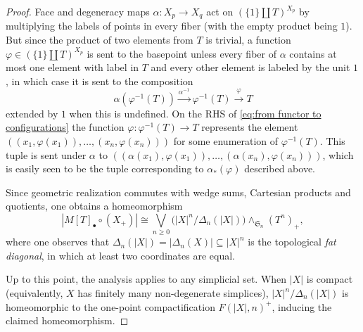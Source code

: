 \documentclass[12pt]{article}
\newcommand{\SymGroup}[1][n]{\mathfrak{S}_{#1}}
\theoremstyle{plain}
\theoremstyle{definition}
\theoremstyle{remark}
\begin{document}
\begin{proof}
Face and degeneracy maps $\alpha: X_p\to X_q$ act on $(\{1\}\coprod T)^{X_p}$ by multiplying the labels of points in every fiber (with the empty product being $1$). But since the product of two elements from $T$ is trivial, a function $\varphi\in (\{1\}\coprod T)^{X_p}$ is sent to the basepoint unless every fiber of $\alpha$ contains at most one element with label in $T$ and every other element is labeled by the unit $1$, in which case it is sent to the composition 
\[
\alpha(\varphi^{-1}(T)) \overset{\alpha^{-1}}{\longrightarrow} \varphi^{-1}(T) \overset{\varphi}\longrightarrow T
\]
extended by $1$ when this is undefined. On the RHS of \eqref{eq:from functor to configurations} the function $\varphi: \varphi^{-1}(T)\to T$ represents the element $((x_1,\varphi(x_1)),\ldots, (x_n,\varphi(x_n)))$ for some enumeration of $\varphi^{-1}(T)$. This tuple is sent under $\alpha$ to $((\alpha(x_1),\varphi(x_1)),\ldots, (\alpha(x_n),\varphi(x_n)))$, which is easily seen to be the tuple corresponding to $\alpha_*(\varphi)$ described above. 



Since geometric realization commutes with wedge sums, Cartesian products and quotients, one obtains a homeomorphism
\[
    |M[T]_{\bullet}\circ(X_+)| \cong \bigvee_{n\geq 0}{\Big(|X|^n/\Delta_n(|X|)\Big)\wedge_{\SymGroup}(T^n)_+},
\]
where one observes that $\Delta_n(|X|) = |\Delta_n(X)|\subseteq |X|^n$ is the topological \emph{fat diagonal}, in which at least two coordinates are equal.

Up to this point, the analysis applies to any simplicial set. When $|X|$ is compact (equivalently, $X$ has finitely many non-degenerate simplices), $|X|^n/\Delta_n(|X|)$ is homeomorphic to the one-point compactification $F(|X|, n)^+$, inducing the claimed homeomorphism.
\end{proof}
\end{document}
